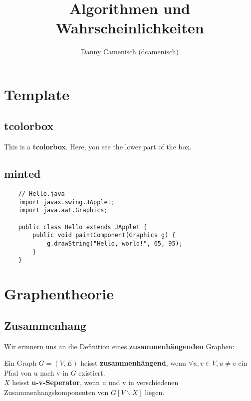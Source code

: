 \documentclass[a4paper]{report}
\title{Algorithmen und Wahrscheinlichkeiten}
\author{Danny Camenisch (dcamenisch)}
\begin{document}
\maketitle
\tableofcontents



\chapter{Template}
\section{tcolorbox}

\begin{tcolorbox}[colback=dcWhite,colframe=dcOrange,title=\textbf{My Heading}]
    This is a \textbf{tcolorbox}.
\tcblower
    Here, you see the lower part of the box.
\end{tcolorbox}

\section{minted}

\begin{verbatim}
    // Hello.java
    import javax.swing.JApplet;
    import java.awt.Graphics;
    
    public class Hello extends JApplet {
        public void paintComponent(Graphics g) {
            g.drawString("Hello, world!", 65, 95);
        }    
    }
\end{verbatim}




\chapter{Graphentheorie}
\section{Zusammenhang}

Wir erinnern uns an die Definition eines \textbf{zusammenhängenden} Graphen:

\begin{tcolorbox}[colframe=dcBlue,title=Definition]
    Ein Graph $G = (V,E)$ heisst \textbf{zusammenhängend}, wenn $\forall u,v \in V, u \neq v$ 
    ein Pfad von u nach v in $G$ existiert. \\

    $X$ heisst \textbf{u-v-Seperator}, wenn u und v in verschiedenen Zusammenhangskomponenten von
    $G[V \backslash X]$ liegen.
\end{tcolorbox}
\bigskip
\end{document}
